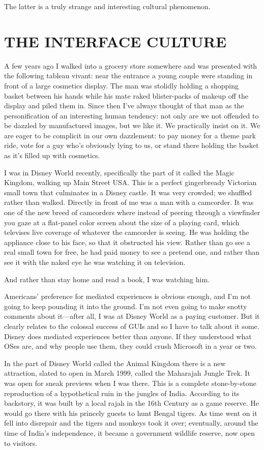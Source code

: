 \documentclass[
  fontsize=11pt,
  paper=landscape,
  twocolumn=true,
  pagesize=pdftex,
  headings=small,
  DIV=15,
  ]{scrartcl}
\begin{document}
The latter is a truly strange and interesting cultural phenomenon.

\section{THE INTERFACE CULTURE}

A few years ago I walked into a grocery store somewhere and was
presented with the following tableau vivant: near the entrance a young
couple were standing in front of a large cosmetics display. The man was
stolidly holding a shopping basket between his hands while his mate
raked blister-packs of makeup off the display and piled them in. Since
then I've always thought of that man as the personification of an
interesting human tendency: not only are we not offended to be dazzled
by manufactured images, but we like it. We practically insist on it. We
are eager to be complicit in our own dazzlement: to pay money for a
theme park ride, vote for a guy who's obviously lying to us, or stand
there holding the basket as it's filled up with cosmetics.

I was in Disney World recently, specifically the part of it called the
Magic Kingdom, walking up Main Street USA. This is a perfect
gingerbready Victorian small town that culminates in a Disney castle. It
was very crowded; we shuffled rather than walked. Directly in front of
me was a man with a camcorder. It was one of the new breed of camcorders
where instead of peering through a viewfinder you gaze at a flat-panel
color screen about the size of a playing card, which televises live
coverage of whatever the camcorder is seeing. He was holding the
appliance close to his face, so that it obstructed his view. Rather than
go see a real small town for free, he had paid money to see a pretend
one, and rather than see it with the naked eye he was watching it on
television.

And rather than stay home and read a book, I was watching him.

Americans' preference for mediated experiences is obvious enough, and
I'm not going to keep pounding it into the ground. I'm not even going to
make snotty comments about it---after all, I was at Disney World as a
paying customer. But it clearly relates to the colossal success of GUIs
and so I have to talk about it some. Disney does mediated experiences
better than anyone. If they understood what OSes are, and why people use
them, they could crush Microsoft in a year or two.

In the part of Disney World called the Animal Kingdom there is a new
attraction, slated to open in March 1999, called the Maharajah Jungle
Trek. It was open for sneak previews when I was there. This is a
complete stone-by-stone reproduction of a hypothetical ruin in the
jungles of India. According to its backstory, it was built by a local
rajah in the 16th Century as a game reserve. He would go there with his
princely guests to hunt Bengal tigers. As time went on it fell into
disrepair and the tigers and monkeys took it over; eventually, around
the time of India's independence, it became a government wildlife
reserve, now open to visitors.
\end{document}
